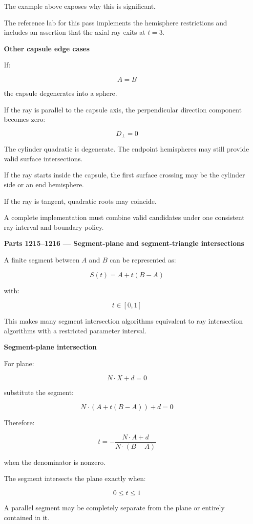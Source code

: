 The example above exposes why this is significant.

The reference lab for this pass implements the hemisphere restrictions and includes an assertion that the axial ray exits at \(t=3\).

\textbf{Other capsule edge cases}

If:

\[
A=B
\]

the capsule degenerates into a sphere.

If the ray is parallel to the capsule axis, the perpendicular direction component becomes zero:

\[
D_\perp=0
\]

The cylinder quadratic is degenerate. The endpoint hemispheres may still provide valid surface intersections.

If the ray starts inside the capsule, the first surface crossing may be the cylinder side or an end hemisphere.

If the ray is tangent, quadratic roots may coincide.

A complete implementation must combine valid candidates under one consistent ray-interval and boundary policy.

\textbf{Parts 1215--1216 --- Segment-plane and segment-triangle intersections}

A finite segment between \(A\) and \(B\) can be represented as:

\[
S(t)=A+t(B-A)
\]

with:

\[
\boxed{t\in[0,1]}
\]

This makes many segment intersection algorithms equivalent to ray intersection algorithms with a restricted parameter interval.

\textbf{Segment-plane intersection}

For plane:

\[
N\cdot X+d=0
\]

substitute the segment:

\[
N\cdot(A+t(B-A))+d=0
\]

Therefore:

\[
\boxed{ t= -\frac{N\cdot A+d}{N\cdot(B-A)} }
\]

when the denominator is nonzero.

The segment intersects the plane exactly when:

\[
0\le t\le1
\]

A parallel segment may be completely separate from the plane or entirely contained in it.

